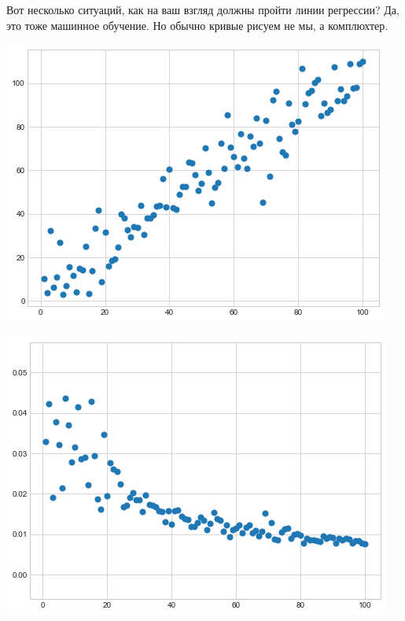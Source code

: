 \documentclass[12pt, a4paper, oneside]{article}
\begin{document}
Вот несколько ситуаций, как на ваш взгляд должны пройти линии регрессии? Да, это тоже машинное обучение. Но обычно кривые рисуем не мы, а комплюхтер.

\begin{minipage}[t]{0.45\textwidth}
	\includegraphics[scale=0.4]{regr_pic_1.png}
\end{minipage}
\hfill
\begin{minipage}[t]{0.45\textwidth}
	\includegraphics[scale=0.4]{regr_pic_2.png}
\end{minipage}
\end{document}
